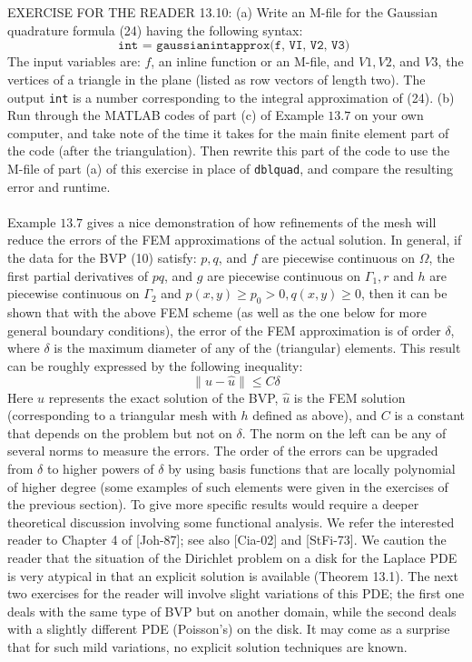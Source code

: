 \documentclass[../main.tex]{subfiles}
\begin{document}
\\
\\
EXERCISE FOR THE READER 13.10: (a) Write an M-file for the Gaussian quadrature formula (24) having the following syntax:
$$
\texttt{int = gaussianintapprox(f, VI, V2, V3) 
}
$$
The input variables are: $f$, an inline function or an M-file, and $V 1, V 2$, and $V 3$, the vertices of a triangle in the plane (listed as row vectors of length two). The output \texttt{int} is a number corresponding to the integral approximation of (24).
(b) Run through the MATLAB codes of part (c) of Example $13.7$ on your own computer, and take note of the time it takes for the main finite element part of the code (after the triangulation). Then rewrite this part of the code to use the M-file of part (a) of this exercise in place of \texttt{dblquad}, and compare the resulting error and runtime.
\\
\\
Example $13.7$ gives a nice demonstration of how refinements of the mesh will reduce the errors of the FEM approximations of the actual solution. In general, if the data for the BVP (10) satisfy: $p, q$, and $f$ are piecewise continuous on $\Omega$, the first partial derivatives of $p q$, and $g$ are piecewise continuous on $\Gamma_{1}, r$ and $h$ are piecewise continuous on $\Gamma_{2}$ and $p(x, y) \geq p_{0}>0, q(x, y) \geq 0$, then it can be shown that with the above FEM scheme (as well as the one below for more general boundary conditions), the error of the FEM approximation is of order $\delta$, where $\delta$ is the maximum diameter of any of the (triangular) elements. This result can be roughly expressed by the following inequality:
\begin{equation}
\|u-\hat{u}\| \leq C \delta
\end{equation}
Here $u$ represents the exact solution of the BVP, $\hat{u}$ is the FEM solution (corresponding to a triangular mesh with $h$ defined as above), and $C$ is a constant that depends on the problem but not on $\delta$. The norm on the left can be any of several norms to measure the errors. The order of the errors can be upgraded from $\delta$ to higher powers of $\delta$ by using basis functions that are locally polynomial of higher degree (some examples of such elements were given in the exercises of the previous section). To give more specific results would require a deeper theoretical discussion involving some functional analysis. We refer the interested reader to Chapter 4 of [Joh-87]; see also [Cia-02] and [StFi-73]. We caution the reader that the situation of the Dirichlet problem on a disk for the Laplace PDE is very atypical in that an explicit solution is available (Theorem 13.1). The next two exercises for the reader will involve slight variations of this PDE; the first one deals with the same type of BVP but on another domain, while the second deals with a slightly different PDE (Poisson's) on the disk. It may come as a surprise that for such mild variations, no explicit solution techniques are known.
\\
\end{document}
